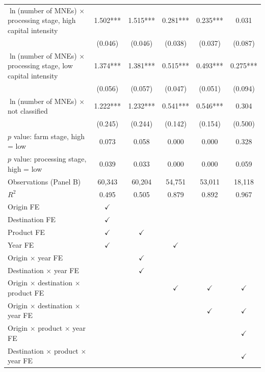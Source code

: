 \begin{tabular}{l*{5}{c}}
$\ln$(number of MNEs) $\times$ processing stage, high capital intensity & 1.502*** & 1.515*** & 0.281*** & 0.235*** & 0.031 \\
 & (0.046) & (0.046) & (0.038) & (0.037) & (0.087) \\
$\ln$(number of MNEs) $\times$ processing stage, low capital intensity & 1.374*** & 1.381*** & 0.515*** & 0.493*** & 0.275*** \\
 & (0.056) & (0.057) & (0.047) & (0.051) & (0.094) \\
$\ln$(number of MNEs) $\times$ not classified & 1.222*** & 1.232*** & 0.541*** & 0.546*** & 0.304 \\
 & (0.245) & (0.244) & (0.142) & (0.154) & (0.500) \\
$p$ value: farm stage, high = low & 0.073 & 0.058 & 0.000 & 0.000 & 0.328 \\
$p$ value: processing stage, high = low & 0.039 & 0.033 & 0.000 & 0.000 & 0.059 \\
Observations (Panel B) & 60,343 & 60,204 & 54,751 & 53,011 & 18,118 \\
$R^2$ & 0.495 & 0.505 & 0.879 & 0.892 & 0.967 \\
\midrule
Origin FE & $\checkmark$ &  &  &  &  \\
Destination FE & $\checkmark$ &  &  &  &  \\
Product FE & $\checkmark$ & $\checkmark$ &  &  &  \\
Year FE & $\checkmark$ &  & $\checkmark$ &  &  \\
Origin $\times$ year FE &  & $\checkmark$ &  &  &  \\
Destination $\times$ year FE &  & $\checkmark$ &  &  &  \\
Origin $\times$ destination $\times$ product FE &  &  & $\checkmark$ & $\checkmark$ & $\checkmark$ \\
Origin $\times$ destination $\times$ year FE &  &  &  & $\checkmark$ & $\checkmark$ \\
Origin $\times$ product $\times$ year FE &  &  &  &  & $\checkmark$ \\
Destination $\times$ product $\times$ year FE &  &  &  &  & $\checkmark$ \\
\bottomrule
\end{tabular}
